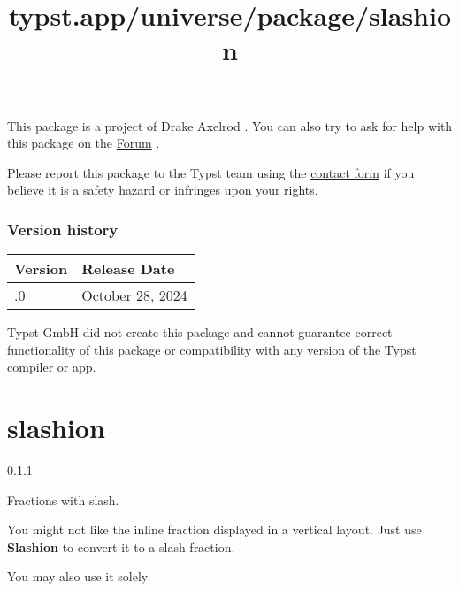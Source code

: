 This package is a project of Drake Axelrod . You can also try to ask for
help with this package on the \href{https://forum.typst.app}{Forum} .

Please report this package to the Typst team using the
\href{https://typst.app/contact}{contact form} if you believe it is a
safety hazard or infringes upon your rights.

\label{versions}
\subsubsection{Version history}\label{version-history}

\begin{longtable}[]{@{}ll@{}}
\toprule\noalign{}
Version & Release Date \\
\midrule\noalign{}
\endhead
\bottomrule\noalign{}
\endlastfoot
0.1.0 & October 28, 2024 \\
\end{longtable}

Typst GmbH did not create this package and cannot guarantee correct
functionality of this package or compatibility with any version of the
Typst compiler or app.


\title{typst.app/universe/package/slashion}

\label{banner}
\section{slashion}\label{slashion}

{ 0.1.1 }

Fractions with slash.

\label{readme}
You might not like the inline fraction displayed in a vertical layout.
Just use \textbf{Slashion} to convert it to a slash fraction.

\begin{Shaded}
\begin{Highlighting}[]
\end{Highlighting}
\end{Shaded}

You may also use it solely

\begin{Shaded}
\begin{Highlighting}[]
\end{Highlighting}
\end{Shaded}

